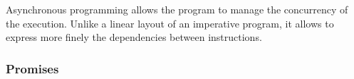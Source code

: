 Asynchronous programming allows the program to manage the concurrency of the execution.
Unlike a linear layout of an imperative program, it allows to express more finely the dependencies between instructions.



\subsubsection{Promises}


